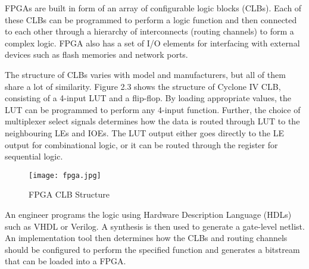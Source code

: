 FPGAs are built in form of an array of configurable logic blocks (CLBs). Each of these CLBs can be programmed to perform a logic function and then connected to each other through a hierarchy of interconnects (routing channels) to form a complex logic. FPGA also has a set of I/O elements for interfacing with external devices such as flash memories and network ports.

The structure of CLBs varies with model and manufacturers, but all of them share a lot of similarity. Figure 2.3 shows the structure of Cyclone IV CLB, consisting of a 4-input LUT and a flip-flop. By loading appropriate values, the LUT can be programmed to perform any 4-input function. Further, the choice of multiplexer select signals determines how the data is routed through LUT to the neighbouring LEs and IOEs. The LUT output either goes directly to the LE output for combinational logic, or it can be routed through the register for sequential logic.
\begin{figure}[H]
\centering
\texttt{[image: fpga.jpg]}
\caption{FPGA CLB Structure}\label{fig:fpga}
\end{figure}

An engineer programs the logic using Hardware Description Language (HDLs) such as VHDL or Verilog. A synthesis is then used to generate a gate-level netlist. An implementation tool then determines how the CLBs and routing channels should be configured to perform the specified function and generates a bitstream that can be loaded into a FPGA.
